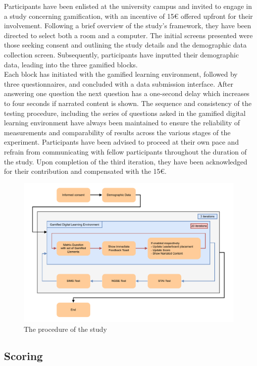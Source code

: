 Participants have been enlisted at the university campus and invited to engage in a study concerning gamification, with an incentive of 15€ offered upfront for their involvement.
Following a brief overview of the study's framework, they have been directed to select both a room and a computer.
The initial screens presented were those seeking consent and outlining the study details and the demographic data collection screen. Subsequently, participants have inputted their demographic data, leading into the three gamified blocks.\\
Each block has initiated with the gamified learning environment, followed by three questionnaires, and concluded with a data submission interface.
After answering one question the next question has a one-second delay which increases to four seconds if narrated content is shown.
The sequence and consistency of the testing procedure, including the series of questions asked in the gamified digital learning environment have always been maintained to ensure the reliability of measurements and comparability of results across the various stages of the experiment.
Participants have been advised to proceed at their own pace and refrain from communicating with fellow participants throughout the duration of the study.
Upon completion of the third iteration, they have been acknowledged for their contribution and compensated with the 15€.
\begin{figure}[H]
  \centering
  \includegraphics[width=\textwidth]{img/Procedure_alt.pdf}
  \caption{The procedure of the study}
  \label{fig:figureProcedure}
\end{figure}

\subsection{Scoring}


